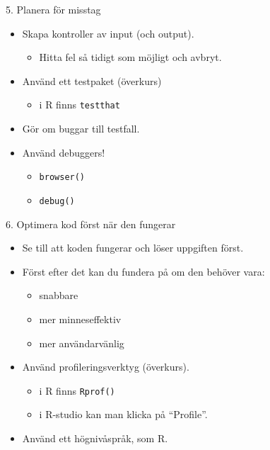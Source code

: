 \documentclass[
  11pt,
  ignorenonframetext,
]{beamer}
\providecommand{\tightlist}{%
  \setlength{\itemsep}{0pt}\setlength{\parskip}{0pt}}
\begin{document}
\begin{frame}{5. Planera för misstag}
\label{planera-fuxf6r-misstag}
\begin{itemize}
\tightlist
\item
  Skapa kontroller av input (och output).

  \begin{itemize}
  \tightlist
  \item
    Hitta fel så tidigt som möjligt och avbryt.
  \end{itemize}
\item
  Använd ett testpaket (överkurs)

  \begin{itemize}
  \tightlist
  \item
    i R finns \texttt{testthat}
  \end{itemize}
\item
  Gör om buggar till testfall.
\item
  Använd debuggers!

  \begin{itemize}
  \tightlist
  \item
    \texttt{browser()}
  \item
    \texttt{debug()}
  \end{itemize}
\end{itemize}
\end{frame}

\begin{frame}{6. Optimera kod först när den fungerar}
\label{optimera-kod-fuxf6rst-nuxe4r-den-fungerar}
\begin{itemize}
\tightlist
\item
  Se till att koden fungerar och löser uppgiften först.
\item
  Först efter det kan du fundera på om den behöver vara:

  \begin{itemize}
  \tightlist
  \item
    snabbare
  \item
    mer minneseffektiv
  \item
    mer användarvänlig
  \end{itemize}
\item
  Använd profileringsverktyg (överkurs).

  \begin{itemize}
  \tightlist
  \item
    i R finns \texttt{Rprof()}
  \item
    i R-studio kan man klicka på ``Profile''.
  \end{itemize}
\item
  Använd ett högnivåspråk, som R.
\end{itemize}
\end{frame}
\end{document}
